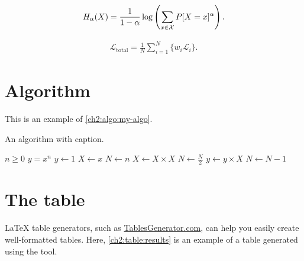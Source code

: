 \begin{equation}
\label{ch2:eq:renyi}
H_{\alpha}(X) =
\frac{1}{1-\alpha}
\log \left(\sum_{x \in {\cal X}}P[X=x]^{\alpha} \right) .
\end{equation}

\begin{equation} 
\label{ch2:eq:total-loss}
\begin{aligned}
\mathcal{L}_{\textrm{total}} = \frac{1}{N}\sum_{i=1}^{N}\{w_i\mathcal{L}_i\}. 
\end{aligned}
\end{equation}


\section{Algorithm}

\begin{paragraph}
This is an example of \autoref{ch2:algo:my-algo}.
\end{paragraph}

\begin{algorithm}[h]
\caption{An algorithm with caption.}
\label{ch2:algo:my-algo}
\normalsize\singlespacing
\begin{algorithmic}[1] %
    \Require $n \geq 0$
    \Ensure $y = x^n$
    \State $y \gets 1$
    \State $X \gets x$
    \State $N \gets n$
        \State $X \gets X \times X$
        \State $N \gets \frac{N}{2}$  
        \State $y \gets y \times X$
        \State $N \gets N - 1$
    \EndIf
    \EndWhile
\end{algorithmic}
\end{algorithm}



\section{The table}

\begin{paragraph}
LaTeX table generators, such as \href{https://www.tablesgenerator.com/}{TablesGenerator.com}\footnotemark{}, can help you easily create well-formatted tables. 
Here, \autoref{ch2:table:results} is an example of a table generated using the tool.
\end{paragraph}
    

